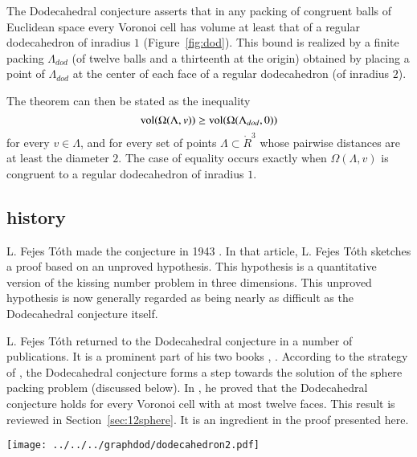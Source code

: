   

The Dodecahedral conjecture asserts that in any packing of congruent balls of Euclidean
space every Voronoi cell has volume at least that of a regular dodecahedron
of inradius $1$ (Figure~\ref{fig:dod}).    This bound is realized by a finite 
packing $\Lambda_{dod}$
(of twelve balls and a thirteenth  at the origin) obtained
by placing a point of $\Lambda_{dod}$ at the center of each face of a regular dodecahedron (of inradius $2$).

The
theorem can then be stated as the inequality
  $$
  {\operatorname{vol}}(\Omega(\Lambda,v)) \ge {\operatorname{vol}}(\Omega(\Lambda_{dod},0))
  $$
for every $v\in\Lambda$, and for every set of points $\Lambda\subset \ring{R}^3$
whose pairwise distances are at least the diameter $2$.
The case of equality occurs exactly when $\Omega(\Lambda,v)$ is
congruent to a regular dodecahedron of inradius $1$.







\subsection{history}


L. Fejes T\'oth made the conjecture in 1943 \cite{Toth1}.  
In that article, L. Fejes
T\'oth sketches a proof based on an unproved hypothesis.  This
hypothesis is a quantitative version of the kissing number problem
in three dimensions.   This unproved hypothesis
is now generally regarded as being 
nearly as difficult as the  Dodecahedral conjecture itself.  

L. Fejes T\'oth returned to the Dodecahedral conjecture in a number
of publications.  It is a prominent part of his two books \cite{Fej72},
\cite{Toth2}.  According to the strategy of \cite{Fej72}, 
the Dodecahedral conjecture forms a
step towards the solution of the sphere packing problem
(discussed below).   In \cite{Toth2}, he proved that the Dodecahedral conjecture
holds for every Voronoi cell with at most twelve faces.  
This result is reviewed in Section~\ref{sec:12sphere}.  It
is an ingredient in the proof presented here. 

\begin{floatingfigure}{30mm}
  \begin{center}
  \texttt{[image: ../../../graphdod/dodecahedron2.pdf]}
   \end{center}
  \caption{}
\label{fig:dod}
\end{floatingfigure}

